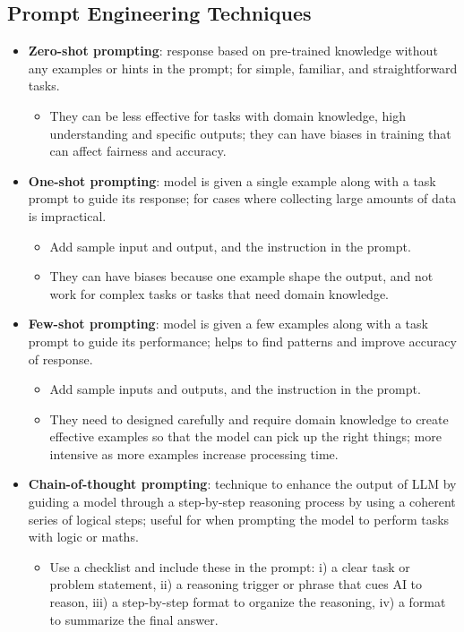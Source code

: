 \documentclass[12pt, letterpaper]{article}
\begin{document}
\subsection{Prompt Engineering Techniques}
\begin{itemize}
    \item \textbf{Zero-shot prompting}: response based on pre-trained knowledge without any examples or hints in the prompt; for simple, familiar, and straightforward tasks. 
        \begin{itemize}
            \item They can be less effective for tasks with domain knowledge, high understanding and specific outputs; they can have biases in training that can affect fairness and accuracy.
        \end{itemize}
    \item \textbf{One-shot prompting}: model is given a single example along with a task prompt to guide its response; for cases where collecting large amounts of data is impractical. 
        \begin{itemize}
            \item Add sample input and output, and the instruction in the prompt.
            \item They can have biases because one example shape the output, and not work for complex tasks or tasks that need domain knowledge.
        \end{itemize}
    \item \textbf{Few-shot prompting}: model is given a few examples along with a task prompt to guide its performance; helps to find patterns and improve accuracy of response.
        \begin{itemize}
            \item Add sample inputs and outputs, and the instruction in the prompt.
            \item They need to designed carefully and require domain knowledge to create effective examples so that the model can pick up the right things; more intensive as more examples increase processing time.
        \end{itemize}
    \item \textbf{Chain-of-thought prompting}: technique to enhance the output of LLM by guiding a model through a step-by-step reasoning process by using a coherent series of logical steps; useful for when prompting the model to perform tasks with logic or maths.
        \begin{itemize}
            \item Use a checklist and include these in the prompt: i) a clear task or problem statement, ii) a reasoning trigger or phrase that cues AI to reason, iii) a step-by-step format to organize the reasoning, iv) a format to summarize the final answer.

\end{itemize}
\end{itemize}
\end{document}
